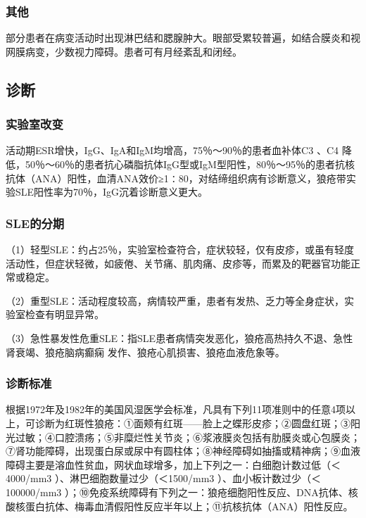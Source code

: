 \subsubsection{其他}

部分患者在病变活动时出现淋巴结和腮腺肿大。眼部受累较普遍，如结合膜炎和视网膜病变，少数视力障碍。患者可有月经紊乱和闭经。

\subsection{诊断}

\subsubsection{实验室改变}

活动期ESR增快，IgG、IgA和IgM均增高，75％～90％的患者血补体C{3} 、C{4}
降低，50％～60％的患者抗心磷脂抗体IgG型或IgM型阳性，80％～95％的患者抗核抗体（ANA）阳性，血清ANA效价≥1∶80，对结缔组织病有诊断意义，狼疮带实验SLE阳性率为70％，IgG沉着诊断意义更大。

\subsubsection{SLE的分期}

（1）轻型SLE：约占25％，实验室检查符合，症状较轻，仅有皮疹，或虽有轻度活动性，但症状轻微，如疲倦、关节痛、肌肉痛、皮疹等，而累及的靶器官功能正常或稳定。

（2）重型SLE：活动程度较高，病情较严重，患者有发热、乏力等全身症状，实验室检查有明显异常。

（3）急性暴发性危重SLE：指SLE患者病情突发恶化，狼疮高热持久不退、急性肾衰竭、狼疮脑病癫痫
发作、狼疮心肌损害、狼疮血液危象等。

\subsubsection{诊断标准}

根据1972年及1982年的美国风湿医学会标准，凡具有下列11项准则中的任意4项以上，可诊断为红斑性狼疮：①面颊有红斑------脸上之蝶形皮疹；②圆盘红斑；③阳光过敏；④口腔溃疡；⑤非糜烂性关节炎；⑥浆液膜炎包括有肋膜炎或心包膜炎；⑦肾功能障碍，出现蛋白尿或尿中有圆柱体；⑧神经障碍如抽搐或精神病；⑨血液障碍主要是溶血性贫血，网状血球增多，加上下列之一：白细胞计数过低（＜4000/mm{3}
）、淋巴细胞数量过少（＜1500/mm{3} ）、血小板计数过少（＜100000/mm{3}
）；⑩免疫系统障碍有下列之一：狼疮细胞阳性反应、DNA抗体、核酸核蛋白抗体、梅毒血清假阳性反应半年以上；⑪抗核抗体（ANA）阳性反应。

